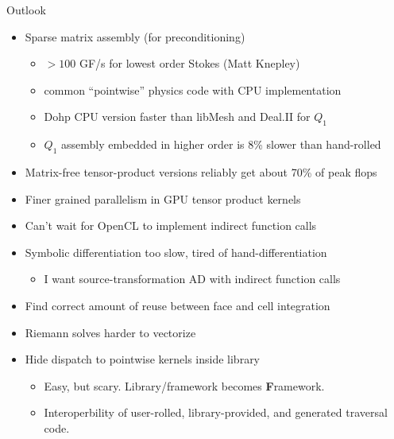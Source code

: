 \documentclass{beamer}
\begin{document}
\begin{frame}{Outlook}
  \begin{itemize}
  \item Sparse matrix assembly (for preconditioning)
    \begin{itemize}
    \item $> 100$ GF/s for lowest order Stokes (Matt Knepley)
    \item common ``pointwise'' physics code with CPU implementation
    \item Dohp CPU version faster than libMesh and Deal.II for $Q_1$
    \item $Q_1$ assembly embedded in higher order is 8\% slower than hand-rolled
    \end{itemize}
  \item Matrix-free tensor-product versions reliably get about 70\% of peak flops
  \item Finer grained parallelism in GPU tensor product kernels
  \item Can't wait for OpenCL to implement indirect function calls
  \item Symbolic differentiation too slow, tired of hand-differentiation
    \begin{itemize}
    \item I want source-transformation AD with indirect function calls
    \end{itemize}
  \item Find correct amount of reuse between face and cell integration
  \item Riemann solves harder to vectorize
  \item Hide dispatch to pointwise kernels inside library
    \begin{itemize}
    \item Easy, but scary. Library/framework becomes \alert{\bf F}ramework.
    \item Interoperbility of user-rolled, library-provided, and generated traversal code.
    \end{itemize}
  \end{itemize}
\end{frame}
\end{document}
